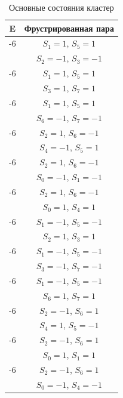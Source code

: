 \documentclass[utf8, babel, sor, jor, amsmath,amssymb, reprint]{elsarticle} %
\begin{document}
\begin{table}[h]
	\centering
	\begin{tabular}{|c|c|}
		\hline
		E   &   Фрустрированная пара \\
		\hline
		-6   &  $S_1=1$, $S_5=1$\\
		      &    $S_2=-1$, $S_3=-1$ \\
		 \hline
		 -6   &  $S_1=1$, $S_5=1$\\
		      &    $S_3=1$, $S_7=1$ \\
		 \hline
		 -6   &  $S_1=1$, $S_5=1$\\
		      &    $S_6=-1$, $S_7=-1$ \\
		 \hline
		-6   &  $S_2=1$, $S_6=-1$\\
				&    $S_4=-1$, $S_5=1$ \\
		 \hline
		-6   &  $S_2=1$, $S_6=-1$\\
				&    $S_0=-1$, $S_1=-1$ \\
		 \hline
		-6   &  $S_2=1$, $S_6=-1$\\
				&    $S_0=1$, $S_4=1$ \\
		\hline
		-6   &  $S_1=-1$, $S_5=-1$\\
			&    $S_2=1$, $S_3=1$ \\
		\hline
		-6   &  $S_1=-1$, $S_5=-1$\\
			&    $S_3=-1$, $S_7=-1$ \\
		\hline
		-6   &  $S_1=-1$, $S_5=-1$\\
			&    $S_6=1$, $S_7=1$ \\
		\hline
		-6   &  $S_2=-1$, $S_6=1$\\
			&    $S_4=1$, $S_5=-1$ \\
		\hline
		-6   &  $S_2=-1$, $S_6=1$\\
			&    $S_0=1$, $S_1=1$ \\
		\hline
		-6   &  $S_2=-1$, $S_6=1$\\
			&    $S_0=-1$, $S_4=-1$ \\
		\hline
	\end{tabular}
	\caption{Основные состояния кластер}
	\label{tab:gs_cl}
\end{table}
\end{document}
